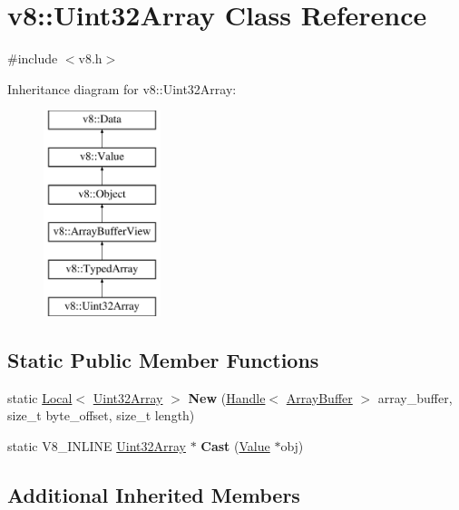 \hypertarget{classv8_1_1Uint32Array}{}\section{v8\+:\+:Uint32\+Array Class Reference}
\label{classv8_1_1Uint32Array}


{\ttfamily \#include $<$v8.\+h$>$}

Inheritance diagram for v8\+:\+:Uint32\+Array\+:\begin{figure}[H]
\begin{center}
\leavevmode
\includegraphics[height=6.000000cm]{classv8_1_1Uint32Array}
\end{center}
\end{figure}
\subsection*{Static Public Member Functions}
\begin{DoxyCompactItemize}
\item 
\hypertarget{classv8_1_1Uint32Array_a38de3d179f9a569a91ee9aef4d9f923f}{}static \hyperlink{classv8_1_1Local}{Local}$<$ \hyperlink{classv8_1_1Uint32Array}{Uint32\+Array} $>$ {\bfseries New} (\hyperlink{classv8_1_1Handle}{Handle}$<$ \hyperlink{classv8_1_1ArrayBuffer}{Array\+Buffer} $>$ array\+\_\+buffer, size\+\_\+t byte\+\_\+offset, size\+\_\+t length)\label{classv8_1_1Uint32Array_a38de3d179f9a569a91ee9aef4d9f923f}

\item 
\hypertarget{classv8_1_1Uint32Array_ad40e645ee0abac443dba759ee861de49}{}static V8\+\_\+\+I\+N\+L\+I\+N\+E \hyperlink{classv8_1_1Uint32Array}{Uint32\+Array} $\ast$ {\bfseries Cast} (\hyperlink{classv8_1_1Value}{Value} $\ast$obj)\label{classv8_1_1Uint32Array_ad40e645ee0abac443dba759ee861de49}

\end{DoxyCompactItemize}
\subsection*{Additional Inherited Members}


